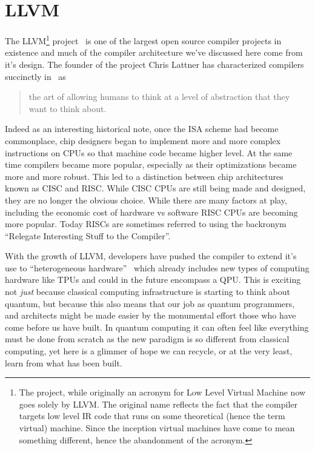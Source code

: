 \section{LLVM}\label{sec:llvm}

The LLVM\footnote{The project, while originally an acronym for Low Level Virtual Machine now goes solely by LLVM. The original name reflects the fact that the compiler targets low level \ac{IR} code that runs on some theoretical (hence the term virtual) machine. Since the inception virtual machines have come to mean something different, hence the abandonment of the acronym.} project~\cite{llvm} is one of the largest open source compiler projects in existence and much of the compiler architecture we've discussed here come from it's design.
The founder of the project Chris Lattner has characterized compilers succinctly in~\cite{lattnerquote} as
\begin{quote}
    the art of allowing humans to think at a level of abstraction that they want to think about.
\end{quote}

Indeed as an interesting historical note, once the \ac{ISA} scheme had become commonplace, chip designers began to implement more and more complex instructions on \acp{CPU} so that machine code became higher level.
At the same time compilers became more popular, especially as their optimizations became more and more robust.
This led to a distinction between chip architectures known as \ac{CISC} and \ac{RISC}.
While \ac{CISC} \acp{CPU} are still being made and designed, they are no longer the obvious choice.
While there are many factors at play, including the economic cost of hardware vs software \ac{RISC} \acp{CPU} are becoming more popular.
Today \acp{RISC} are sometimes referred to using the backronym ``Relegate Interesting Stuff to the Compiler''.

With the growth of LLVM, developers have pushed the compiler to extend it's use to ``heterogeneous hardware''~\cite{mlir} which already includes new types of computing hardware like \acp{TPU} and could in the future encompass a \ac{QPU}.
This is exciting not \emph{just} because classical computing infrastructure is starting to think about quantum, but because this also means that our job as quantum programmers, and architects might be made easier by the monumental effort those who have come before us have built.
In quantum computing it can often feel like everything must be done from scratch as the new paradigm is so different from classical computing, yet here is a glimmer of hope we can recycle, or at the very least, learn from what has been built.
